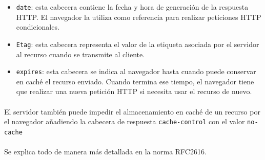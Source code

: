 \documentclass{article}
\begin{document}
	\begin{itemize}
		\item \texttt{date}: esta cabecera contiene la fecha y hora de generación de la respuesta HTTP. El navegador la utiliza como referencia para realizar peticiones HTTP condicionales.
		\item \texttt{Etag}: esta cabecera representa el valor de la etiqueta asociada por el servidor al recurso cuando se transmite al cliente.
		\item \texttt{expires}: esta cabecera se indica al navegador hasta cuando puede conservar en caché el recurso enviado. Cuando termina ese tiempo, el navegador tiene que realizar una nueva petición HTTP si necesita usar el recurso de nuevo.
	\end{itemize} 
	
	\paragraph{}El servidor también puede impedir el almacenamiento en caché de un recurso por el navegador añadiendo la cabecera de respuesta \texttt{cache-control} con el valor \texttt{no-cache}
	
	\paragraph{}Se explica todo de manera más detallada en la norma RFC2616.
\end{document}
